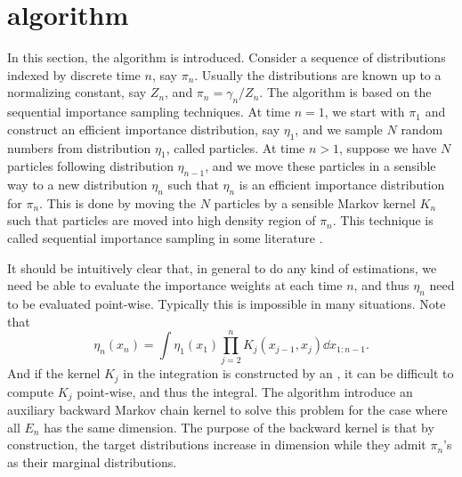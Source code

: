 \section{\smc algorithm}
\label{sec:smc algorithm}

In this section, the \smc algorithm is introduced. Consider a sequence of
distributions indexed by discrete time $n$, say $\pi_n$. Usually the
distributions are known up to a normalizing constant, say $Z_n$, and $\pi_n
= \gamma_n/Z_n$. The \smc algorithm is based on the sequential importance
sampling techniques. At time $n = 1$, we start with $\pi_1$ and construct an
efficient importance distribution, say $\eta_1$, and we sample $N$ random
numbers from distribution $\eta_1$, called particles. At time $n > 1$,
suppose we have $N$ particles following distribution $\eta_{n-1}$, and we
move these particles in a sensible way to a new distribution $\eta_n$ such
that $\eta_n$ is an efficient importance distribution for $\pi_n$. This is
done by moving the $N$ particles by a sensible Markov kernel $K_n$ such that
particles are moved into high density region of $\pi_n$. This technique is
called sequential importance sampling in some literature
\parencite[e.g.][]{DelMoral2006}.

It should be intuitively clear that, in general to do any kind of estimations,
we need be able to evaluate the importance weights at each time $n$, and thus
$\eta_n$ need to be evaluated point-wise. Typically this is impossible in many
situations. Note that
\begin{equation}
  \eta_n(x_n) = \int\eta_1(x_1)\prod_{j=2}^nK_j(x_{j-1},x_j) \dd x_{1:n-1}.
  \label{eq:marginal importance}
\end{equation}
And if the kernel $K_j$ in the integration is constructed by an \mha, it can
be difficult to compute $K_j$ point-wise, and thus the integral. The \smc
algorithm introduce an auxiliary backward Markov chain kernel to solve this
problem for the case where all $E_n$ has the same dimension. The purpose of
the backward kernel is that by construction, the target distributions increase
in dimension while they admit $\pi_n$'s as their marginal distributions.

